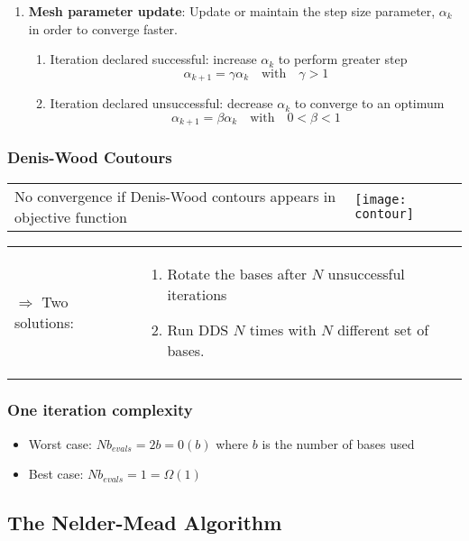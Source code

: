 \begin{enumerate}
    \item \textbf{Mesh parameter update}: Update or maintain the step
        size parameter, $\alpha_k$ in order to converge faster.

        \begin{enumerate}
            \item Iteration declared successful: increase $\alpha_k$ to
                perform greater step
                $$\alpha_{k+1} = \gamma \alpha_k \quad \textrm{with}\quad \gamma > 1$$

            \item Iteration declared unsuccessful: decrease $\alpha_k$ to
                converge to an optimum
                $$\alpha_{k+1} = \beta \alpha_k \quad \textrm{with}\quad
                0 < \beta < 1$$
            \end{enumerate}
\end{enumerate}

\subsubsection{Denis-Wood Coutours}

\begin{tabular}{m{12cm}m{5cm}}
No convergence if Denis-Wood contours appears in objective
function
&
\texttt{[image: contour]}
\end{tabular}

\begin{tabular}{m{3cm}m{10cm}}
    $\Rightarrow$ Two solutions:&
\begin{enumerate}
    \item Rotate the bases after $N$ unsuccessful iterations
    \item Run DDS $N$ times with $N$ different set of bases.
    \end{enumerate}
    \end{tabular}

\subsubsection{One iteration complexity}
\begin{itemize}
    \item Worst case: $Nb_{evals} = 2b = 0(b)$ where $b$ is the number
        of bases used
    \item Best case: $Nb_{evals} = 1 = \Omega(1)$
\end{itemize}


\subsection{The Nelder-Mead Algorithm}

